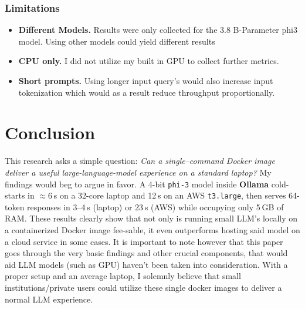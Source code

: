 \documentclass[conference]{IEEEtran}
\begin{document}
\subsubsection*{Limitations}
\begin{itemize}
  \item \textbf{Different Models.}  Results were only collected for the 3.8 B-Parameter phi3 model. Using other models could yield different results
  \item \textbf{CPU only.}  I did not utilize my built in GPU to collect further metrics.
  \item \textbf{Short prompts.}  Using longer input query's would also increase input tokenization which would as a result reduce throughput proportionally.
\end{itemize}


\section{Conclusion}\label{sec:conclusion}
This research asks a simple question: \emph{Can a single–command Docker image
deliver a useful large-language-model experience on a standard laptop?} My findings would beg to argue in favor. A 4-bit \texttt{phi-3} model inside \textbf{Ollama} cold-starts in
$\approx$6 s on a 32-core laptop and 12 s on an AWS \texttt{t3.large},
then serves 64-token responses in 3–4 s (laptop) or 23 s (AWS) while
occupying only 5 GB of RAM. These results clearly show that not only is running small LLM's locally on a containerized Docker image fee-sable, it even outperforms hosting said model on a cloud service in some cases. It is important to note however that this paper goes through the very basic findings and other crucial components, that would aid LLM models (such as GPU) haven't been taken into consideration. With a proper setup and an average laptop, I solemnly believe that small institutions/private users could utilize these single docker images to deliver a normal LLM experience.



\end{document}
